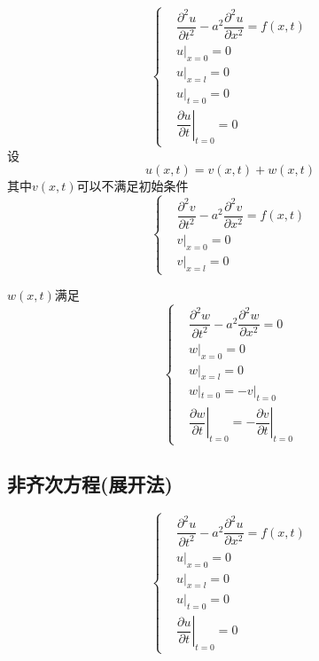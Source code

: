 \documentclass{article}
\begin{document}
\begin{equation*}
  \left\{
  \begin{aligned}
    & \dfrac{\partial^{2} u}{\partial t^{2}} - a^{2} \dfrac{\partial^{2} u}{\partial x^{2}} = f(x,t) \\
    & u |_{x=0} = 0\\
    & u |_{x=l} = 0\\
    & u |_{t=0} = 0\\
    & \!\!\left. \dfrac{\partial u}{\partial t} \right|_{t=0} = 0
  \end{aligned}
  \right.
\end{equation*}
设
\begin{equation*}
  u(x,t) = v(x,t) + w(x,t)
\end{equation*}
其中$v(x,t)$可以不满足初始条件
\begin{equation*}
  \left\{
  \begin{aligned}
    & \dfrac{\partial^{2} v}{\partial t^{2}} - a^{2} \dfrac{\partial^{2} v}{\partial x^{2}} = f(x,t) \\
    & v |_{x=0} = 0\\
    & v |_{x=l} = 0
  \end{aligned}
  \right.
\end{equation*}

$w(x,t)$满足
\begin{equation*}
  \left\{
  \begin{aligned}
    & \dfrac{\partial^{2} w}{\partial t^{2}} - a^{2} \dfrac{\partial^{2} w}{\partial x^{2}} = 0 \\
    & w |_{x=0} = 0\\
    & w |_{x=l} = 0\\
    & w |_{t=0} = - v |_{t=0}\\
    & \!\!\left. \dfrac{\partial w}{\partial t} \right|_{t=0} = - \left. \dfrac{\partial v}{\partial t} \right|_{t=0}
  \end{aligned}
  \right.
\end{equation*}


\subsection{非齐次方程(展开法)}
\begin{equation*}
  \left\{
  \begin{aligned}
    & \dfrac{\partial^{2} u}{\partial t^{2}} - a^{2} \dfrac{\partial^{2} u}{\partial x^{2}} = f(x,t) \\
    & u |_{x=0} = 0\\
    & u |_{x=l} = 0\\
    & u |_{t=0} = 0\\
    & \!\!\left. \dfrac{\partial u}{\partial t} \right|_{t=0} = 0
  \end{aligned}
  \right.
\end{equation*}
\end{document}
